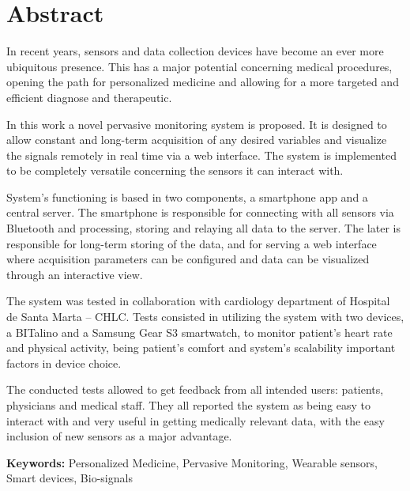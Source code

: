 
\section*{Abstract}


In recent years, sensors and data collection devices have become an ever more ubiquitous presence. This has a major potential concerning medical procedures, opening the path for personalized medicine and allowing for a more targeted and efficient diagnose and therapeutic.

In this work a novel pervasive monitoring system is proposed. It is designed to allow constant and long-term acquisition of any desired variables and visualize the signals remotely in real time via a web interface. The system is implemented to be completely versatile concerning the sensors it can interact with.

System’s functioning is based in two components, a smartphone app and a central server. The smartphone is responsible for connecting with all sensors via Bluetooth and processing, storing and relaying all data to the server. The later is responsible for long-term storing of the data, and for serving a web interface where acquisition parameters can be configured and data can be visualized through an interactive view.

The system was tested in collaboration with cardiology department of Hospital de Santa Marta – CHLC. Tests consisted in utilizing the system with two devices, a BITalino and a Samsung Gear S3 smartwatch, to monitor patient’s heart rate and physical activity, being patient’s comfort and system’s scalability important factors in device choice.

The conducted tests allowed to get feedback from all intended users: patients, physicians and medical staff. They all reported the system as being easy to interact with and very useful in getting medically relevant data, with the easy inclusion of new sensors as a major advantage.



\vfill

\textbf{\Large Keywords:} Personalized Medicine, Pervasive Monitoring, Wearable sensors, Smart devices, Bio-signals

